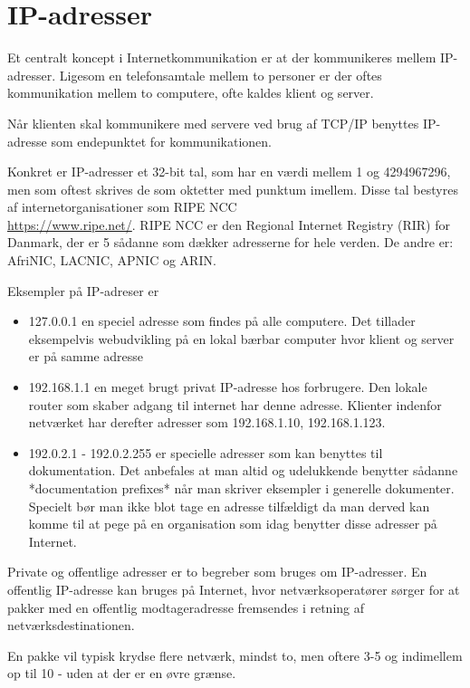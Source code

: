 \documentclass[a4paper,11pt,notitlepage]{report}
\begin{document}
\chapter{ IP-adresser}

Et centralt koncept i Internetkommunikation er at der kommunikeres mellem IP-adresser. Ligesom en telefonsamtale mellem to personer er der oftes kommunikation mellem to computere, ofte kaldes klient og server.

Når klienten skal kommunikere med servere ved brug af TCP/IP benyttes IP-adresse som endepunktet for kommunikationen.

Konkret er IP-adresser et 32-bit tal, som har en værdi mellem 1 og 4294967296, men som oftest skrives de som oktetter med punktum imellem. Disse tal bestyres af internetorganisationer som RIPE NCC\\ \url{https://www.ripe.net/}. RIPE NCC er den Regional Internet Registry (RIR) for Danmark, der er 5 sådanne som dækker adresserne for hele verden. De andre er: AfriNIC, LACNIC, APNIC og ARIN.


Eksempler på IP-adreser er
\begin{itemize}
\item 127.0.0.1 en speciel adresse som findes på alle computere. Det tillader eksempelvis webudvikling på en lokal bærbar computer hvor klient og server er på samme adresse

\item 192.168.1.1 en meget brugt privat IP-adresse hos forbrugere. Den lokale router som skaber adgang til internet har denne adresse. Klienter indenfor netværket har derefter adresser som 192.168.1.10, 192.168.1.123.

\item 192.0.2.1 - 192.0.2.255 er specielle adresser som kan benyttes til dokumentation. Det anbefales at man altid og udelukkende benytter sådanne *documentation prefixes* når man skriver eksempler i generelle dokumenter. Specielt bør man ikke blot tage en adresse tilfældigt da man derved kan komme til at pege på en organisation som idag benytter disse adresser på Internet.
\end{itemize}
Private og offentlige adresser er to begreber som bruges om IP-adresser. En offentlig IP-adresse kan bruges på Internet, hvor netværksoperatører sørger for at pakker med en offentlig modtageradresse fremsendes i retning af netværksdestinationen.

En pakke vil typisk krydse flere netværk, mindst to, men oftere 3-5 og indimellem op til 10 - uden at der er en øvre grænse.
\end{document}
